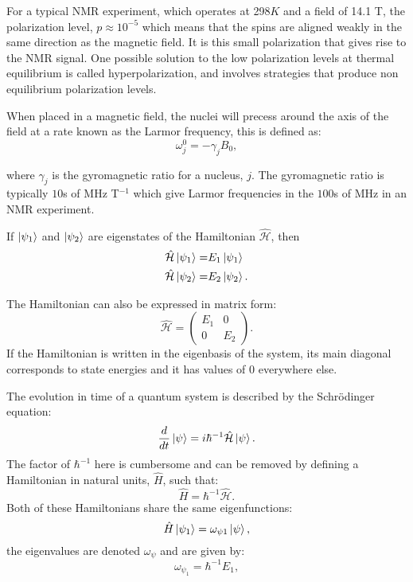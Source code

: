 For a typical NMR experiment, which operates at 298$K$ and
a field of 14.1 T, the polarization level, $p \approx 10^{-5}$ which means that the spins are aligned weakly
in the same direction as the magnetic field. It is this small polarization that gives rise to the NMR
signal. One possible solution to the low polarization levels at thermal equilibrium is called hyperpolarization, and
involves strategies that produce non equilibrium polarization levels.

When placed in a magnetic field, the nuclei will precess around the axis of the field at a rate known as the Larmor frequency, this is defined as:
\begin{equation}\label{eqn:Larmor}
  \omega_j^0 = -\gamma_jB_0,
\end{equation}

where $\gamma_j$ is the gyromagnetic ratio for a nucleus, $j$. The gyromagnetic ratio is
typically $10$s of MHz T$^{-1}$ which give Larmor frequencies in the $100$s of MHz in an NMR
experiment.


If $\ket{\psi_1}$ and $\ket{\psi_2}$ are eigenstates of the Hamiltonian $\hat{\mathcal{H}}$, then
\begin{align}
  \hat{\mathcal{H}}\ket{\psi_1} =& E_1\ket{\psi_1}\\
  \hat{\mathcal{H}}\ket{\psi_2} =& E_2\ket{\psi_2}.
\end{align}

The Hamiltonian can also be expressed in matrix form:
\begin{equation}
  \hat{\mathcal{H}} = \begin{pmatrix}
    E_1 & 0\\
    0 & E_2
\end{pmatrix}.
\end{equation}
If the Hamiltonian is written in the eigenbasis of the system, its main diagonal corresponds to state energies and it has values of $0$ everywhere else.

The evolution in time of a quantum system is described by the Schr\"odinger equation:
\begin{equation}
  \frac{d}{dt}\ket{\psi} = i\hbar^{-1}\hat{\mathcal{H}}\ket{\psi}.
\end{equation}
The factor of $\hbar^{-1}$ here is cumbersome and can be removed by defining a Hamiltonian in natural units, $\hat{H}$,
such that:
\begin{equation}
  \hat{H} = \hbar^{-1}\hat{\mathcal{H}}.
\end{equation}
Both of these Hamiltonians share the same eigenfunctions:
\begin{equation}
  \hat{H}\ket{\psi_1} = \omega_{\psi1}\ket{\psi},
\end{equation}
the eigenvalues are denoted $\omega_{\psi}$ and are given by:
\begin{equation}
  \omega_{\psi_1} = \hbar^{-1}E_1,
\end{equation}


